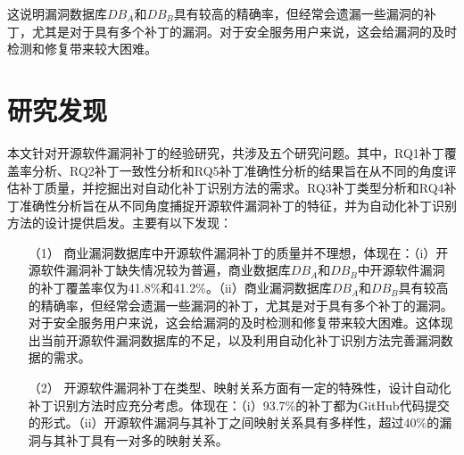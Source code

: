 这说明漏洞数据库$DB_A$和$DB_B$具有较高的精确率，但经常会遗漏一些漏洞的补丁，尤其是对于具有多个补丁的漏洞。对于安全服务用户来说，这会给漏洞的及时检测和修复带来较大困难。%

\section{研究发现}
本文针对开源软件漏洞补丁的经验研究，共涉及五个研究问题。其中，RQ1补丁覆盖率分析、RQ2补丁一致性分析和RQ5补丁准确性分析的结果旨在从不同的角度评估补丁质量，并挖掘出对自动化补丁识别方法的需求。RQ3补丁类型分析和RQ4补丁准确性分析旨在从不同角度捕捉开源软件漏洞补丁的特征，并为自动化补丁识别方法的设计提供启发。主要有以下发现：

\begin{enumerate}
    \item [（1）]商业漏洞数据库中开源软件漏洞补丁的质量并不理想，体现在：（i）开源软件漏洞补丁缺失情况较为普遍，商业数据库$DB_A$和$DB_B$中开源软件漏洞的补丁覆盖率仅为41.8\%和41.2\%。（ii）商业漏洞数据库$DB_A$和$DB_B$具有较高的精确率，但经常会遗漏一些漏洞的补丁，尤其是对于具有多个补丁的漏洞。对于安全服务用户来说，这会给漏洞的及时检测和修复带来较大困难。这体现出当前开源软件漏洞数据库的不足，以及利用自动化补丁识别方法完善漏洞数据的需求。
    \item [（2）]开源软件漏洞补丁在类型、映射关系方面有一定的特殊性，设计自动化补丁识别方法时应充分考虑。体现在：（i）93.7\%的补丁都为GitHub代码提交的形式。（ii）开源软件漏洞与其补丁之间映射关系具有多样性，超过40\%的漏洞与其补丁具有一对多的映射关系。
\end{enumerate}

